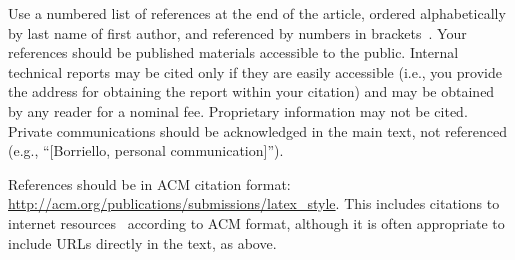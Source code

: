 \documentclass{sigchi}
\begin{document}
Use a numbered list of references at the end of the article, ordered
alphabetically by last name of first author, and referenced by numbers
in
brackets~\cite{acm_categories,ethics,Klemmer:2002:WSC:503376.503378}.
Your references should be published materials accessible to the
public. Internal technical reports may be cited only if they are
easily accessible (i.e., you provide the address for obtaining the
report within your citation) and may be obtained by any reader for a
nominal fee. Proprietary information may not be cited. Private
communications should be acknowledged in the main text, not referenced
(e.g., ``[Borriello, personal communication]'').

References should be in ACM citation format:
\url{http://acm.org/publications/submissions/latex_style}. This
includes citations to internet
resources~\cite{acm_categories,cavender:writing,CHINOSAUR:venue,psy:gangnam}
according to ACM format, although it is often appropriate to include
URLs directly in the text, as above.



\end{document}
